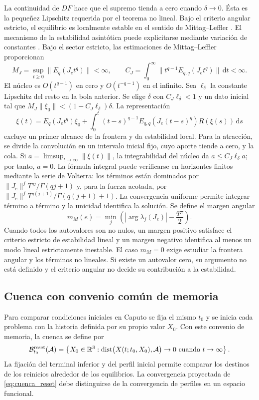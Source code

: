 La continuidad de \(DF\) hace que el supremo tienda a cero cuando
\(\delta\to0\). Ésta es la pequeñez Lipschitz requerida por el teorema
no lineal. Bajo el criterio angular
estricto, el equilibrio es localmente estable en el sentido de
Mittag--Leffler \cite{CongTuanTrinh2020Asymptotic}.
El mecanismo de la estabilidad asintótica puede explicitarse mediante
variación de constantes \cite{CongDoanSiegmundTuan2016}. Bajo el sector
estricto, las estimaciones de Mittag--Leffler proporcionan
\[
 M_J=\sup_{t\ge0}\|E_q(J_et^q)\|<\infty,\qquad
 C_J=\int_0^\infty\|t^{q-1}E_{q,q}(J_et^q)\|\,\mathrm dt<\infty.
\]
El núcleo es $O(t^{q-1})$ en cero y $O(t^{-q-1})$ en el infinito.
Sea $\ell_\delta$ la constante Lipschitz del resto en la bola anterior.
Se elige $\delta$ con $C_J\ell_\delta<1$ y un dato inicial tal que
$M_J\|\xi_0\|<(1-C_J\ell_\delta)\delta$. La representación
\[
 \xi(t)=E_q(J_et^q)\xi_0+
 \int_0^t(t-s)^{q-1}E_{q,q}(J_e(t-s)^q)R(\xi(s))\,\mathrm ds
\]
excluye un primer alcance de la frontera y da estabilidad local.
Para la atracción, se divide la convolución en un intervalo inicial fijo,
cuyo aporte tiende a cero, y la cola. Si
$a=\limsup_{t\to\infty}\|\xi(t)\|$, la integrabilidad del núcleo da
$a\le C_J\ell_\delta a$; por tanto, $a=0$.
La fórmula integral puede verificarse en horizontes finitos mediante la
serie de Volterra: los términos están dominados por
$\|J_e\|^jT^{qj}/\Gamma(qj+1)$ y, para la fuerza acotada, por
$\|J_e\|^jT^{q(j+1)}/\Gamma(q(j+1)+1)$. La convergencia uniforme
permite integrar término a término y la unicidad identifica la solución.
Se define el margen angular
\begin{equation}
m_M(e)=
\min_j\left(
|\arg\lambda_j(J_e)|-\frac{q\pi}{2}
\right).
\label{eq:margen_matignon}
\end{equation}
Cuando todos los autovalores son no nulos, un margen positivo satisface el
criterio estricto de estabilidad lineal y un margen negativo identifica al
menos un modo lineal estrictamente inestable. El caso \(m_M=0\) exige estudiar
la frontera angular y los términos no lineales. Si existe un autovalor cero,
su argumento no está definido y el criterio angular no decide su contribución
a la estabilidad.

\ifHAFOBasinMaterial
\subsection{Cuenca con convenio común de memoria}

Para comparar condiciones iniciales en Caputo se fija el mismo \(t_0\) y se
inicia cada problema con la historia definida por su propio valor \(X_0\).
Con este convenio de memoria, la cuenca se define por
\begin{equation}
\mathcal B_{t_0}^{\mathrm{reset}}(\mathcal A)=
\left\{
X_0\in\mathbb{R}^3:
\operatorname{dist}\bigl(X(t;t_0,X_0),\mathcal A\bigr)\to0
\ \text{cuando}\ t\to\infty
\right\}.
\label{eq:cuenca_reset}
\end{equation}
La fijación del terminal inferior y del perfil inicial permite comparar los
destinos de los reinicios alrededor de los equilibrios. La convergencia
proyectada de \cref{eq:cuenca_reset} debe distinguirse de la convergencia
de perfiles en un espacio funcional.
\fi
\fi
\endgroup
\fi
